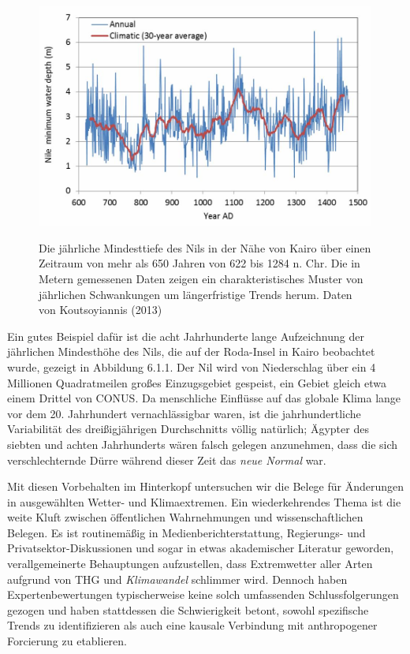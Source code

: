 \documentclass[12pt,paper=a4,DIV=12,parskip=never,chapterprefix=false,headings=standardclasses]{scrreprt}
\begin{document}
\begin{figure}[H]
\begin{center}
\includegraphics[width=1.0\textwidth]{bilder/bilderKlima-0036.jpg}\\[1cm]
\end{center}
\caption{Die jährliche Mindesttiefe des Nils in der Nähe von Kairo über einen Zeitraum von mehr als 650
Jahren von 622 bis 1284 n. Chr. Die in Metern gemessenen Daten zeigen ein charakteristisches Muster
von jährlichen Schwankungen um längerfristige Trends herum. Daten von Koutsoyiannis (2013)}
\end{figure}

Ein gutes Beispiel dafür ist die acht Jahrhunderte lange Aufzeichnung der jährlichen Mindesthöhe des Nils, die auf der Roda-Insel in Kairo beobachtet wurde, gezeigt in Abbildung 6.1.1. Der Nil wird von Niederschlag über ein 4 Millionen Quadratmeilen großes Einzugsgebiet gespeist, ein Gebiet gleich etwa einem Drittel von CONUS. Da menschliche Einflüsse auf das globale Klima lange vor dem 20. Jahrhundert vernachlässigbar waren, ist die jahrhundertliche Variabilität des dreißigjährigen Durchschnitts völlig natürlich; Ägypter des siebten und achten Jahrhunderts wären falsch gelegen anzunehmen, dass die sich verschlechternde Dürre während dieser Zeit das \emph{neue Normal} war.

Mit diesen Vorbehalten im Hinterkopf untersuchen wir die Belege für Änderungen in ausgewählten Wetter- und Klimaextremen. Ein wiederkehrendes Thema ist die weite Kluft zwischen öffentlichen Wahrnehmungen und wissenschaftlichen Belegen. Es ist routinemäßig in Medienberichterstattung, Regierungs- und Privatsektor-Diskussionen und sogar in etwas akademischer Literatur geworden, verallgemeinerte Behauptungen aufzustellen, dass Extremwetter aller Arten aufgrund von THG und \emph{Klimawandel} schlimmer wird. Dennoch haben Expertenbewertungen typischerweise keine solch umfassenden Schlussfolgerungen gezogen und haben stattdessen die Schwierigkeit betont, sowohl spezifische Trends zu identifizieren als auch eine kausale Verbindung mit anthropogener Forcierung zu etablieren.
\end{document}
